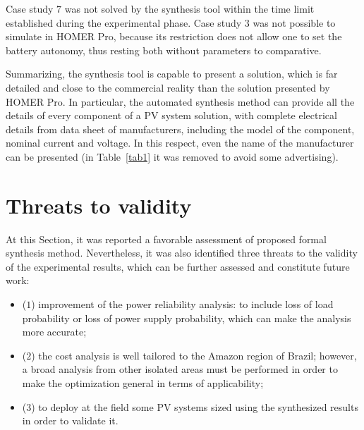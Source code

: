 Case study $7$ was not solved by the synthesis tool 
within the time limit established during the experimental 
phase. Case study $3$ was not possible to simulate in HOMER Pro, 
because its restriction does not allow one to set the battery autonomy, 
thus resting both without parameters to comparative.

Summarizing, the synthesis tool is capable to present a 
solution, which is far detailed and close to the commercial 
reality than the solution presented by HOMER Pro. 
In particular, the automated synthesis method 
can provide all the details of every component of 
a PV system solution, with complete electrical details 
from data sheet of manufacturers, including 
the model of the component, nominal current and voltage. 
In this respect, even the name of the manufacturer 
can be presented (in Table~\ref{tab1} it was removed 
to avoid some advertising).

\section{Threats to validity}

At this Section, it was reported a favorable assessment of proposed formal synthesis method. 
Nevertheless, it was also identified three threats to the validity 
of the experimental results, which can be further assessed and 
constitute future work: 

\begin{itemize}
\item ($1$) improvement of the power reliability 
analysis: to include loss of load probability or loss of power 
supply probability, which can make the analysis more accurate; 
\item ($2$) the cost analysis is well tailored to the Amazon region of Brazil; 
however, a broad analysis from other isolated areas must be 
performed in order to make the optimization general in terms 
of applicability; 
\item ($3$) to deploy at the field some PV systems 
sized using the synthesized results in order to validate it.
\end{itemize}


